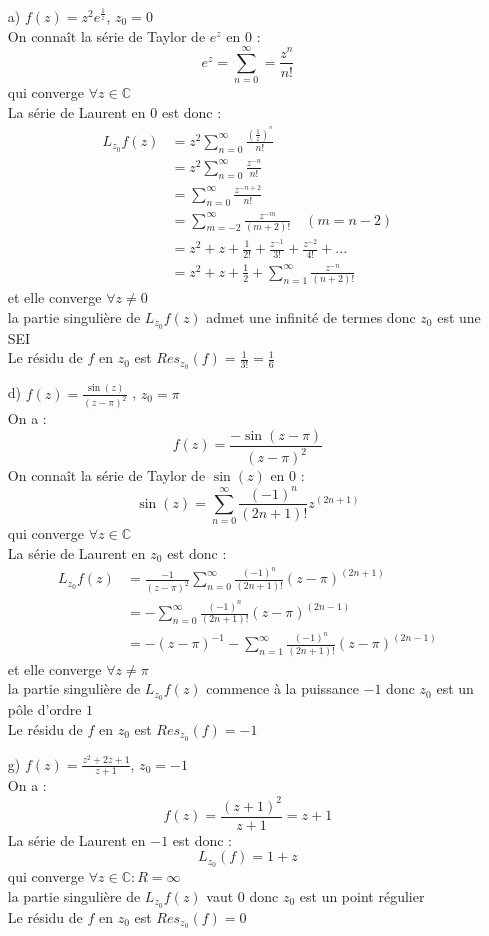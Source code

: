 \begin{enumerate}
    \item[a)] $f(z) = z^2 e^{\frac{1}{z}}$, $z_0 = 0$ \\
    On connaît la série de Taylor de $e^z$ en $0$ :
    $$e^z = \sum_{n=0}^{\infty} = \frac{z^n}{n!}$$
    qui converge $\forall z \in \mathbb{C}$ \\
    La série de Laurent en $0$ est donc :
    \begin{align*}
        L_{z_0}f(z) &= z^2 \sum_{n=0}^{\infty} \frac{(\frac{1}{z})^{^n}}{n!} \\
        &= z^2 \sum_{n=0}^{\infty} \frac{z^{-n}}{n!} \\
        &= \sum_{n=0}^{\infty} \frac{z^{-n+2}}{n!} \\
        &= \sum_{m=-2}^{\infty} \frac{z^{-m}}{(m+2)!} \quad (m=n-2) \\
        &= z^2 + z + \frac{1}{2!} + \frac{z^{-1}}{3!} + \frac{z^{-2}}{4!} + ... \\
        &= z^2 + z + \frac{1}{2} + \sum_{n=1}^{\infty} \frac{z^{-n}}{(n+2)!}
    \end{align*}
    et elle converge $\forall z \neq 0$ \\
    la partie singulière de $L_{z_0}f(z)$ admet une infinité de termes donc $z_0$ est une SEI \\
    Le résidu de $f$ en $z_0$ est $Res_{z_0}(f) = \frac{1}{3!} = \frac{1}{6}$
    \item[d)] $f(z) = \frac{\sin(z)}{(z-\pi)^2}$ , $z_0 = \pi$ \\
    On a :
    $$f(z) = \frac{-\sin(z-\pi)}{(z-\pi)^2}$$
    On connaît la série de Taylor de $\sin(z)$ en $0$ :
    $$\sin(z) = \sum_{n=0}^{\infty} \frac{(-1)^n}{(2n+1)!}z^{(2n+1)}$$
    qui converge $\forall z \in \mathbb{C}$ \\
    La série de Laurent en $z_0$ est donc :
    \begin{align*}
        L_{z_0}f(z) &= \frac{-1}{(z-\pi)^2} \sum_{n=0}^{\infty} \frac{(-1)^n}{(2n+1)!}(z-\pi)^{(2n+1)} \\
        &= -\sum_{n=0}^{\infty} \frac{(-1)^n}{(2n+1)!}(z-\pi)^{(2n-1)} \\
        &= -(z-\pi)^{-1} - \sum_{n=1}^{\infty} \frac{(-1)^n}{(2n+1)!}(z-\pi)^{(2n-1)}
    \end{align*}
    et elle converge $\forall z \neq \pi$ \\
    la partie singulière de $L_{z_0}f(z)$ commence à la puissance $-1$ donc $z_0$ est un pôle d'ordre $1$ \\
    Le résidu de $f$ en $z_0$ est $Res_{z_0}(f) = -1$
    \item[g)] $f(z) = \frac{z^2+2z+1}{z+1}$, $z_0 = -1$ \\
    On a :
    $$f(z) = \frac{(z+1)^2}{z+1} = z+1$$
    La série de Laurent en $-1$ est donc :
    $$L_{z_0}(f) = 1 + z$$
    qui converge $\forall z \in \mathbb{C} : R = \infty$ \\
    la partie singulière de $L_{z_0}f(z)$ vaut $0$ donc $z_0$ est un point régulier \\
    Le résidu de $f$ en $z_0$ est $Res_{z_0}(f) = 0$
\end{enumerate}